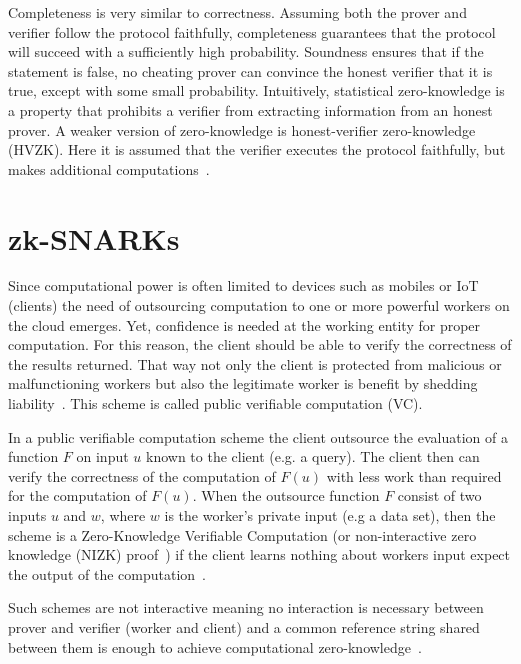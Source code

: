 Completeness is very similar to correctness. Assuming both the prover and verifier follow the protocol faithfully, completeness guarantees that the
protocol will succeed with a sufficiently high probability.
Soundness ensures that if the statement is false, no cheating prover can convince the honest verifier that it is true, except with some small probability.
Intuitively, statistical zero-knowledge is a property that prohibits a verifier from extracting information from an honest prover.
A weaker version of zero-knowledge is honest-verifier zero-knowledge (HVZK). Here it is assumed that the verifier executes the protocol faithfully,
but makes additional computations~\cite{kiagias:crypto}.

\section{zk-SNARKs}
\label{zkp:snarks}

Since computational power is often limited to devices such as mobiles or IoT (clients) the need of outsourcing computation to one or more powerful workers on the cloud emerges. Yet, confidence is needed at the working entity for proper computation. For this reason, the client should be able to verify the correctness of the results returned. That way not only the client is protected from malicious or malfunctioning workers but also the legitimate worker is benefit by shedding liability~\cite{pinocchio-nearly-practical-verifiable-computation}. This scheme is called public verifiable computation (VC).

In a public verifiable computation scheme the client outsource the evaluation of a function $F$ on input $u$ known to the client (e.g. a query). The client then can verify the correctness of the computation of $F(u)$ with less work than required for the computation of $F(u)$. When the outsource function $F$ consist of two inputs $u$ and $w$, where $w$ is the worker's private input (e.g a data set), then the scheme is a Zero-Knowledge Verifiable Computation (or non-interactive zero knowledge (NIZK) proof~\cite{Blum:1991:NZ:123137.123145}) if the client learns nothing about workers input expect the output of the computation~\cite{pinocchio-nearly-practical-verifiable-computation}.

Such schemes are not interactive meaning no interaction is necessary between prover and verifier (worker and client) and a common reference string shared between them is enough to achieve computational zero-knowledge~\cite{Blum:1991:NZ:123137.123145}.

